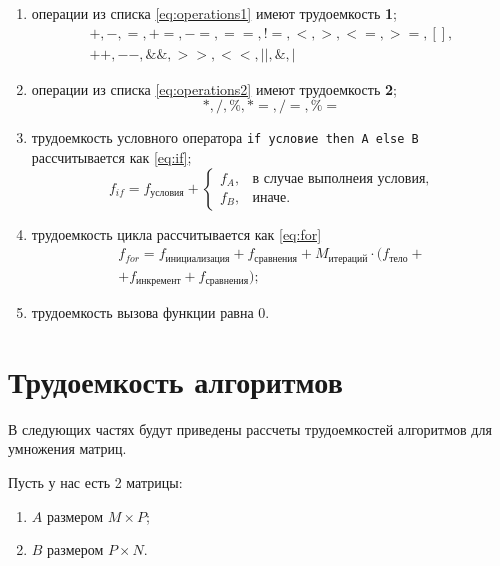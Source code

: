 \begin{enumerate}
	\item операции из списка \ref{eq:operations1} имеют трудоемкость \textbf{1};
	\begin{equation}
		\label{eq:operations1}
		\begin{gathered}
			+, -, =, +=, -=, ==, !=, <, >, <=, >=, [], \\ ++, --, \&\&, >>, <<, ||, \&, |
		\end{gathered}
	\end{equation}
	\item операции из списка \ref{eq:operations2} имеют трудоемкость \textbf{2};
	\begin{equation}
		\label{eq:operations2}
		*, /, \%, *=, /=, \%=
	\end{equation}
	\item трудоемкость условного оператора \texttt{if условие then A else B} рассчитывается как \ref{eq:if};
	\begin{equation}
		\label{eq:if}
		f_{if} = f_{\text{условия}} + 
		\begin{cases}
			f_{A}, & \text{в случае выполнеия условия,}\\
			f_{B}, & \text{иначе}.
		\end{cases}
	\end{equation}
	\item трудоемкость цикла рассчитывается как \ref{eq:for}
	\begin{equation}
		\label{eq:for}
		\begin{gathered}
			f_{for} = f_{\text{инициализация}} + f_{\text{сравнения}} + M_{\text{итераций}} \cdot (f_{\text{тело}} +\\
			+ f_{\text{инкремент}} + f_{\text{сравнения}});
		\end{gathered}
	\end{equation}
	\item трудоемкость вызова функции равна 0.
\end{enumerate}

\clearpage

\section{Трудоемкость алгоритмов}
В следующих частях будут приведены рассчеты трудоемкостей алгоритмов для умножения матриц.

Пусть у нас есть 2 матрицы: 
\begin{enumerate}
	\item $A$ размером $M \times P$;
	\item $B$ размером $P \times N$.
\end{enumerate}

